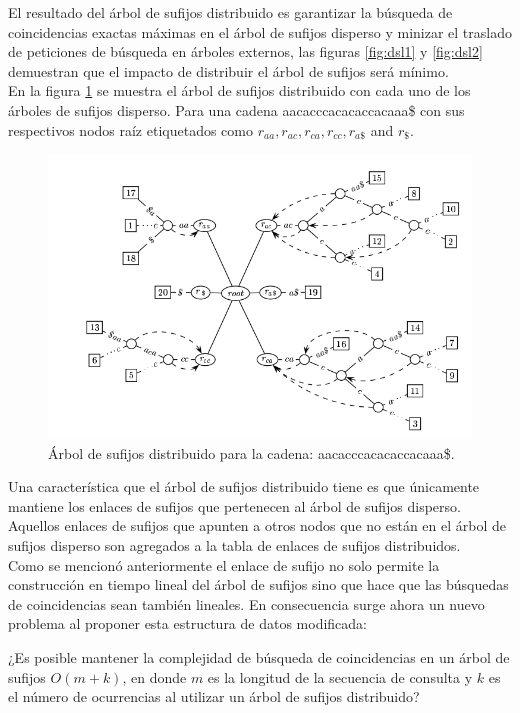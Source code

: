 \documentclass[12pt,a4paper]{article}
\begin{document}
El resultado del árbol de sufijos distribuido es garantizar la búsqueda de coincidencias exactas máximas en el árbol de sufijos disperso y minizar el traslado de peticiones de búsqueda en árboles externos, las figuras \ref{fig:dsl1} y \ref{fig:dsl2} demuestran que el impacto de distribuir el árbol de sufijos será mínimo.\\
\indent
En la figura \ref{fig:dst} se muestra el árbol de sufijos distribuido con cada uno de los árboles de sufijos disperso. Para una
cadena aacacccacacaccacaaa\$ con sus respectivos nodos raíz etiquetados como $r_{aa}, r_{ac}, r_{ca}, r_{cc}, r_{a\$}$ and $r_{\$}$.
\begin{figure}[h]
\begin{center}
\includegraphics[scale=0.4]{dst2.png}
\caption{Árbol de sufijos distribuido para la cadena: aacacccacacaccacaaa\$.}
\label{fig:dst}
\end{center}
\end{figure}
Una característica que el árbol de sufijos distribuido tiene es que únicamente mantiene los enlaces de sufijos que pertenecen al 
árbol de sufijos disperso. Aquellos enlaces de sufijos que apunten a otros nodos que no están en el árbol de sufijos disperso
son agregados a la tabla de enlaces de sufijos distribuidos.\\
Como se mencionó anteriormente el enlace de sufijo no solo permite la construcción en tiempo lineal del árbol de sufijos sino
que hace que las búsquedas de coincidencias sean tambi\'en lineales. En consecuencia surge ahora un nuevo problema al proponer
esta estructura de datos modificada:\\
\begin{center}
  ¿Es posible mantener la complejidad de búsqueda de coincidencias en un árbol de sufijos $O(m+k)$, en donde $m$ es la
  longitud de la secuencia de consulta y $k$ es el número de ocurrencias al utilizar un árbol de sufijos distribuido?
\end{center}
\end{document}
